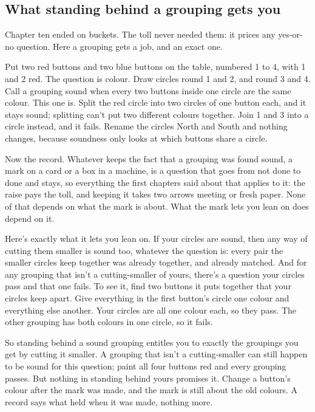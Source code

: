 \documentclass[11pt,twoside]{article}
\theoremstyle{thielethm}
\theoremstyle{thieledef}
\theoremstyle{thieledef}
\theoremstyle{thieledef}
\theoremstyle{thielethm}
\theoremstyle{thieleobs}
\theoremstyle{thielethm}
\begin{document}
\subsection{What standing behind a grouping gets you}

Chapter ten ended on buckets. The toll never needed them: it prices any yes-or-no question. Here a grouping gets a job, and an exact one.

Put two red buttons and two blue buttons on the table, numbered 1 to 4, with 1 and 2 red. The question is colour. Draw circles round 1 and 2, and round 3 and 4. Call a grouping sound when every two buttons inside one circle are the same colour. This one is. Split the red circle into two circles of one button each, and it stays sound; splitting can't put two different colours together. Join 1 and 3 into a circle instead, and it fails. Rename the circles North and South and nothing changes, because soundness only looks at which buttons share a circle.

Now the record. Whatever keeps the fact that a grouping was found sound, a mark on a card or a box in a machine, is a question that goes from not done to done and stays, so everything the first chapters said about that applies to it: the raise pays the toll, and keeping it takes two arrows meeting or fresh paper. None of that depends on what the mark is about. What the mark lets you lean on does depend on it.

Here's exactly what it lets you lean on. If your circles are sound, then any way of cutting them smaller is sound too, whatever the question is: every pair the smaller circles keep together was already together, and already matched. And for any grouping that isn't a cutting-smaller of yours, there's a question your circles pass and that one fails. To see it, find two buttons it puts together that your circles keep apart. Give everything in the first button's circle one colour and everything else another. Your circles are all one colour each, so they pass. The other grouping has both colours in one circle, so it fails.

So standing behind a sound grouping entitles you to exactly the groupings you get by cutting it smaller. A grouping that isn't a cutting-smaller can still happen to be sound for this question; paint all four buttons red and every grouping passes. But nothing in standing behind yours promises it. Change a button's colour after the mark was made, and the mark is still about the old colours. A record says what held when it was made, nothing more.
\end{document}
